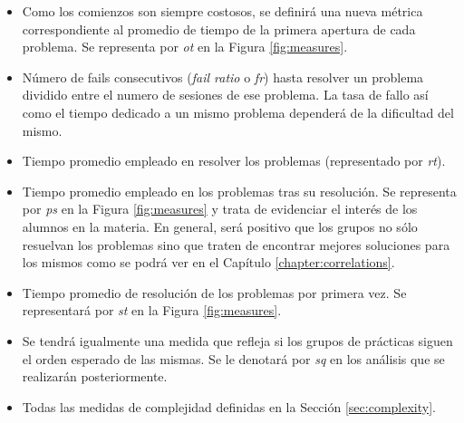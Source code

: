 \begin{itemize}
\item Como los comienzos son siempre costosos, se definirá una nueva métrica correspondiente al promedio de tiempo de la primera apertura de cada problema. Se representa por \emph{ot} en la Figura \ref{fig:measures}.
\item Número de fails consecutivos (\emph{fail ratio} o \emph{fr}) hasta resolver un problema dividido entre el numero de sesiones de ese problema. La tasa de fallo así como el tiempo dedicado a un mismo problema dependerá de la dificultad del mismo.
\item Tiempo promedio empleado en resolver los problemas (representado por \emph{rt}).
\item Tiempo promedio empleado en los problemas tras su resolución. Se representa por \emph{ps} en la Figura \ref{fig:measures} y trata de evidenciar el interés de los alumnos en la materia. En general, será positivo que los grupos no sólo resuelvan los problemas sino que traten de encontrar mejores soluciones para los mismos como se podrá ver en el Capítulo \ref{chapter:correlations}.
\item Tiempo promedio de resolución de los problemas por primera vez. Se representará por \emph{st} en la Figura \ref{fig:measures}.
\item Se tendrá igualmente una medida que refleja si los grupos de prácticas siguen el orden esperado de las mismas. Se le denotará por \emph{sq} en los análisis que se realizarán posteriormente.
\item Todas las medidas de complejidad definidas en la Sección \ref{sec:complexity}.
\end{itemize}